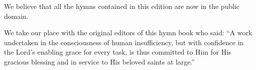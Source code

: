 \documentclass{book}
\begin{document}
We believe that all the hymns contained in this edition are now in the public
domain.

We take our place with the original editors of this hymn book who said: ``A
work undertaken in the consciousness of human insufficiency, but with
confidence in the Lord's enabling grace for every task, is thus committed to
Him for His gracious blessing and in service to His beloved saints at large.''

\vspace*{\fill}

\afterpage{\null\newpage}

\restoregeometry



\newpage
{}

\end{document}
